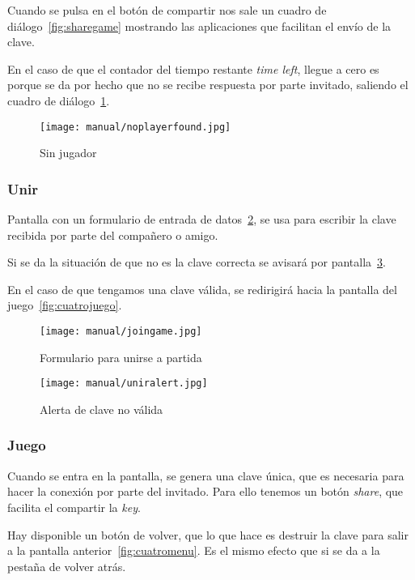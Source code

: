 Cuando se pulsa en el botón de compartir nos sale un cuadro de diálogo~\ref{fig:sharegame} mostrando las aplicaciones que facilitan el envío de la clave.

En el caso de que el contador del tiempo restante \emph{time left}, llegue a cero es porque se da por hecho que no se recibe respuesta por parte invitado, saliendo el cuadro de diálogo~\ref{fig:noplayerfound}.

\begin{figure}[H]
	\centering
	\texttt{[image: manual/noplayerfound.jpg]}
	\caption{Sin jugador}\label{fig:noplayerfound}
\end{figure}

\subsubsection{Unir}\label{cuatrounir}
Pantalla con un formulario de entrada de datos~\ref{fig:cuatrounir}, se usa para escribir la clave recibida por parte del compañero o amigo. 

Si se da la situación de que no es la clave correcta se avisará por pantalla~\ref{fig:uniralert}.

En el caso de que tengamos una clave válida, se redirigirá hacia la pantalla del juego~\ref{fig:cuatrojuego}.

\begin{figure}[H]
	\centering
	\texttt{[image: manual/joingame.jpg]}
	\caption{Formulario para unirse a partida}\label{fig:cuatrounir}
\end{figure}

\begin{figure}[H]
	\centering
	\texttt{[image: manual/uniralert.jpg]}
	\caption{Alerta de clave no válida}\label{fig:uniralert}
\end{figure}

\subsubsection{Juego}\label{cuatrojuego}
Cuando se entra en la pantalla, se genera una clave única, que es necesaria para hacer la conexión por parte del invitado. Para ello tenemos un botón \emph{share}, que facilita el compartir la \emph{key}.

Hay disponible un botón de volver, que lo que hace es destruir la clave para salir a la pantalla anterior~\ref{fig:cuatromenu}. Es el mismo efecto que si se da a la pestaña de volver atrás.